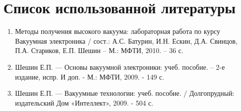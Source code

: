 \documentclass[a4paper]{article}
\begin{document}
\section{Список использованной литературы}
\begin{enumerate}
\item Методы получения высокого вакуума: лабораторная работа по курсу Вакуумная электроника / сост.: А.С. Батурин, И.Н. Ескин, Д.А. Свинцов, П.А. Стариков, Е.П. Шешин – М.: МФТИ, 2010. – 36 с.
\item Шешин Е.П. — Основы вакуумной электроники: учеб. пособие. – 2-е издание, испр. И доп. - М.: МФТИ, 2009.  - 149 с.
\item Шешин Е.П. — Вакуумные технологии: учеб. пособие. / 
Долгопрудный: издательский Дом «Интеллект», 2009.  - 504 с.
\end{enumerate}
\end{document}

